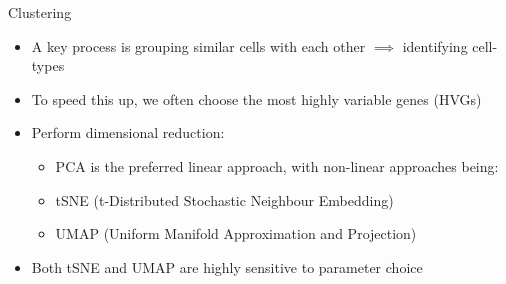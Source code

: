 \documentclass[aspectratio=169,11pt]{beamer}
\begin{document}
\begin{frame}{Clustering}

	\begin{itemize}
		\item A key process is grouping similar cells with each other $\implies$ identifying cell-types
		\item To speed this up, we often choose the most highly variable genes (HVGs)
		\item Perform dimensional reduction:
		\begin{itemize}
			\item PCA is the preferred linear approach, with non-linear approaches being:
			\item tSNE (t-Distributed Stochastic Neighbour Embedding)
			\item UMAP (Uniform Manifold Approximation and Projection)
		\end{itemize}
		\item Both tSNE and UMAP are highly sensitive to parameter choice
	\end{itemize}

\end{frame}
\end{document}
